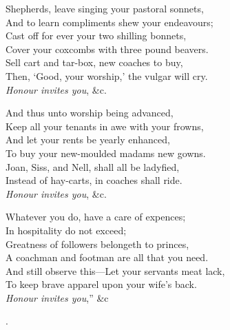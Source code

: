 \begin{dcverse}
\begin{patverse}
Shepherds, leave singing your pastoral sonnets,\\
And to learn compliments shew your endeavours;\\
Cast off for ever your two shilling bonnets,\\
Cover your coxcombs with three pound beavers.\\
Sell cart and tar-box, new coaches to buy,\\
Then, ‘Good, your worship,’ the vulgar will cry.\\
\textit{Honour invites you}, \&c.
\end{patverse}

\begin{patverse}
And thus unto worship being advanced,\\
Keep all your tenants in awe with your frowns,\\
And let your rents be yearly enhanced,\\
To buy your new-moulded madams new gowns.\\
Joan, Siss, and Nell, shall all be ladyfied,\\
Instead of hay-carts, in coaches shall ride.\\
\textit{Honour invites you}, \&c.
\end{patverse}

\begin{patverse}
Whatever you do, have a care of expences;\\
In hospitality do not exceed;\\
Greatness of followers belongeth to princes,\\
A coachman and footman are all that you need.\\
And still observe this—Let your servants meat lack,\\
To keep brave apparel upon your wife’s back.\\
\textit{Honour invites you},” \&c
\end{patverse}.
\end{dcverse}

\pagebreak


